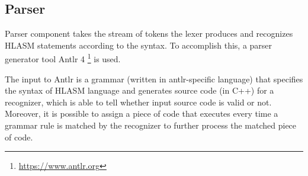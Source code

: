 \subsection{Parser}

Parser component takes the stream of tokens the lexer produces and recognizes HLASM statements according to the syntax. To accomplish this, a parser generator tool Antlr 4 \footnote{\url{https://www.antlr.org}} is used.

The input to Antlr is a grammar (written in antlr-specific language) that specifies the syntax of HLASM language and generates source code (in C++) for a recognizer, which is able to tell whether input source code is valid or not. Moreover, it is possible to assign a piece of code that executes every time a grammar rule is matched by the recognizer to further process the matched piece of code.
